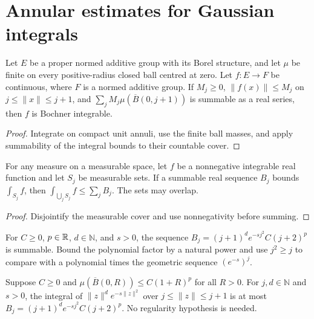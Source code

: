 \section{Annular estimates for Gaussian integrals}

\begin{lemma}
\label{lem:annulus-integrability}
Let $E$ be a proper normed additive group with its Borel structure, and let $\mu$ be finite on every positive-radius closed ball centred at zero. Let $f:E\to F$ be continuous, where $F$ is a normed additive group. If $M_j\ge0$, $\|f(x)\|\le M_j$ on $j\le\|x\|\le j+1$, and $\sum_j M_j\mu(\overline B(0,j+1))$ is summable as a real series, then $f$ is Bochner integrable.
\end{lemma}
\begin{proof}
Integrate on compact unit annuli, use the finite ball masses, and apply summability of the integral bounds to their countable cover.
\end{proof}

\begin{lemma}
\label{lem:nonnegative-integral-cover-bound}
For any measure on a measurable space, let $f$ be a nonnegative integrable real function and let $S_j$ be measurable sets. If a summable real sequence $B_j$ bounds $\int_{S_j}f$, then $\int_{\bigcup_j S_j}f\le\sum_j B_j$. The sets may overlap.
\end{lemma}
\begin{proof}
Disjointify the measurable cover and use nonnegativity before summing.
\end{proof}

\begin{lemma}
\label{lem:gaussian-annulus-majorant}
For $C\ge0$, $p\in\mathbb R$, $d\in\mathbb N$, and $s>0$, the sequence $B_j=(j+1)^d e^{-s j^2}C(j+2)^p$ is summable. Bound the polynomial factor by a natural power and use $j^2\ge j$ to compare with a polynomial times the geometric sequence $(e^{-s})^j$.
\end{lemma}

\begin{lemma}
\label{lem:gaussian-annulus-integral}
Suppose $C\ge0$ and $\mu(\overline B(0,R))\le C(1+R)^p$ for all $R>0$. For $j,d\in\mathbb N$ and $s>0$, the integral of $\|z\|^d e^{-s\|z\|^2}$ over $j\le\|z\|\le j+1$ is at most $B_j=(j+1)^d e^{-s j^2}C(j+2)^p$. No regularity hypothesis is needed.
\end{lemma}

